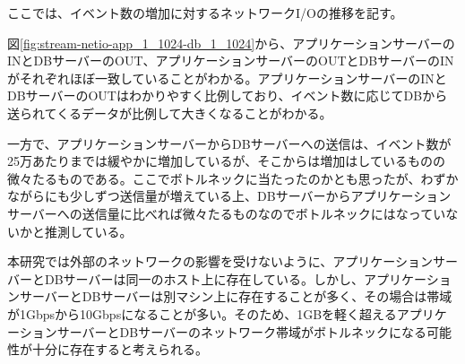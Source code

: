 \documentclass[../../../../../main]{subfiles}
\begin{document}
    \label{subsubsec:result-streaming-only-limit-diskio}

    ここでは、イベント数の増加に対するネットワークI/Oの推移を記す。

    

    図\ref{fig:stream-netio-app_1_1024-db_1_1024}から、アプリケーションサーバーのINとDBサーバーのOUT、アプリケーションサーバーのOUTとDBサーバーのINがそれぞれほぼ一致していることがわかる。アプリケーションサーバーのINとDBサーバーのOUTはわかりやすく比例しており、イベント数に応じてDBから送られてくるデータが比例して大きくなることがわかる。

    一方で、アプリケーションサーバーからDBサーバーへの送信は、イベント数が25万あたりまでは緩やかに増加しているが、そこからは増加はしているものの微々たるものである。ここでボトルネックに当たったのかとも思ったが、わずかながらにも少しずつ送信量が増えている上、DBサーバーからアプリケーションサーバーへの送信量に比べれば微々たるものなのでボトルネックにはなっていないかと推測している。

    本研究では外部のネットワークの影響を受けないように、アプリケーションサーバーとDBサーバーは同一のホスト上に存在している。しかし、アプリケーションサーバーとDBサーバーは別マシン上に存在することが多く、その場合は帯域が1Gbpsから10Gbpsになることが多い。そのため、1GBを軽く超えるアプリケーションサーバーとDBサーバーのネットワーク帯域がボトルネックになる可能性が十分に存在すると考えられる。
\end{document}
